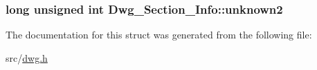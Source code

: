 \hypertarget{structDwg__Section__Info_aada4b88f2cab401b11aacebfa8d53b4e}{
\subsubsection[{unknown2}]{\setlength{\rightskip}{0pt plus 5cm}long unsigned int {\bf \-Dwg\-\_\-\-Section\-\_\-\-Info\-::unknown2}}}\label{structDwg__Section__Info_aada4b88f2cab401b11aacebfa8d53b4e}


\-The documentation for this struct was generated from the following file\-:\begin{DoxyCompactItemize}
\item 
src/\hyperlink{dwg_8h}{dwg.\-h}\end{DoxyCompactItemize}
